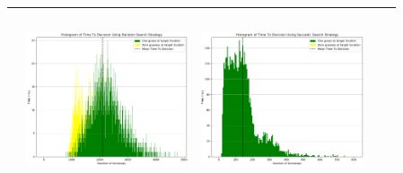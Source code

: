 \begin{landscape}
\begin{table}[h!]
\begin{tabular}{ | m{8mm} | c | c | c | c |}
\begin{minipage}[c][58mm][c]{48mm}
    \end{minipage}
    &
    \begin{minipage}[c][58mm][c]{48mm}
      \includegraphics[width=48mm, height=52mm]{Chapters/MultiAgentTargetDetection/Figs/Histograms/MiscalibratedSensor/4-4/4-4RandomHistogram.png}
    \end{minipage}
    &
    \begin{minipage}[c][58mm][c]{48mm}
      \includegraphics[width=48mm, height=52mm]{Chapters/MultiAgentTargetDetection/Figs/Histograms/MiscalibratedSensor/4-4/4-4SaccadicHistogram.png}
    \end{minipage}
    \\
    \hline


\end{tabular}
\end{table}
\end{landscape}
